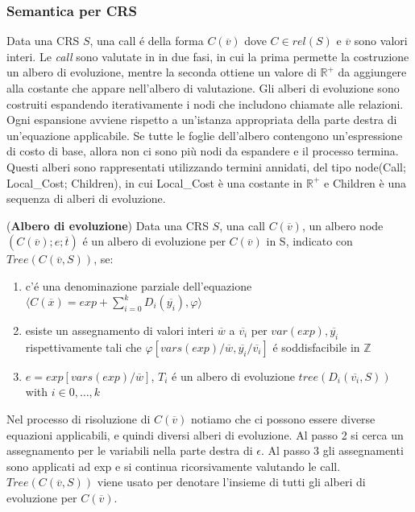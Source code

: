 \documentclass[../../main.tex]{subfiles}
\begin{document}
\subsubsection{Semantica per CRS}
Data una CRS $S$, una call é della forma $C(\overline{v})$ dove $C \in rel(S)$ e $\overline{v}$ sono valori interi.
Le \textit{call} sono valutate in in due fasi, in cui la prima permette la costruzione un albero di evoluzione, mentre la seconda ottiene un valore di $\mathbb{R}^+$ da aggiungere alla costante che appare nell'albero di valutazione.
Gli alberi di evoluzione sono costruiti espandendo iterativamente i nodi che includono chiamate alle relazioni. Ogni espansione avviene rispetto a un'istanza appropriata della parte destra di un'equazione applicabile. Se tutte le foglie dell'albero contengono un'espressione di costo di base, allora non ci sono più nodi da espandere e il processo termina. Questi alberi sono rappresentati utilizzando termini annidati, del tipo node(Call; Local\_Cost; Children), in cui Local\_Cost è una costante in $\mathbb{R}^+$ e Children è una sequenza di alberi di evoluzione.

\begin{definition}(\textbf{Albero di evoluzione})
    Data una CRS $S$, una call $C(\overline{v})$, un albero node $(C(\overline{v}); e; \overline{t})$ é un albero di evoluzione per $C(\overline{v})$ in S, indicato con $Tree (C(\overline{v},S))$, se:
    \begin{enumerate}
        \item c'é una denominazione parziale dell'equazione $\langle C(\overline{x}) = exp + \sum_{i = 0}^k D_i(\overline{y_i}), \varphi \rangle$
        \item esiste un assegnamento di valori interi $\overline{w}$ a $\overline{v_i}$ per $var(exp), \overline{y_i}$ rispettivamente tali che $\varphi[vars(exp)/\overline{w}, \overline{y_i}/\overline{v_i}]$ é soddisfacibile in $\mathbb{Z}$
        \item $e = exp[vars(exp)/\overline{w}]$, $T_i$ é un albero di evoluzione  $tree(D_i (\overline{v_i}, S))$ with $i \in 0,\dots,k$ 
    \end{enumerate}
\end{definition}

Nel processo di risoluzione di $C(\overline{v})$ notiamo che ci possono essere diverse equazioni applicabili, e quindi diversi alberi di evoluzione.
Al passo 2 si cerca un assegnamento per le variabili nella parte destra di $\epsilon$. Al passo 3 gli assegnamenti sono applicati ad exp e si continua ricorsivamente valutando le call.
$Tree(C(\overline{v}, S))$ viene usato per denotare l'insieme di tutti gli alberi di evoluzione per $C(\overline{v})$.
\end{document}
